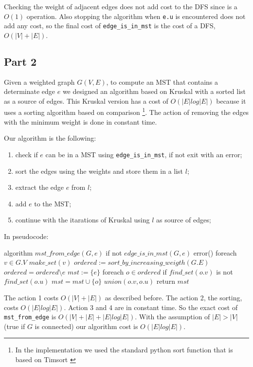 \documentclass[paper=a4, fontsize=11pt]{scrartcl} %
\numberwithin{equation}{section} %
\numberwithin{figure}{section} %
\numberwithin{table}{section} %
\begin{document}
Checking the weight of adjacent edges does not add cost to the DFS since is a $O(1)$ operation. Also stopping the algorithm when \verb|e.u| is encountered does not add any cost, so the final cost of \verb|edge_is_in_mst| is the cost of a DFS, $O(|V|+|E|)$.

\subsection*{Part 2}

Given a weighted graph $G(V, E)$, to compute an MST that contains a determinate edge $e$ we designed an algorithm based on Kruskal with a sorted list as a source of edges.
This Kruskal version has a cost of $O(|E|log|E|)$ because it uses a sorting algorithm based on comparison \footnote{In the implementation we used the standard python sort function that is based on Timsort \cite{timsort}}. The action of removing the edges with the minimum weight is done in constant time.

Our algorithm is the following:

\begin{enumerate}
    \item check if $e$ can be in a MST using \verb|edge_is_in_mst|, if not exit with an error;
    \item sort the edges using the weights and store them in a list $l$;
    \item extract the edge $e$ from $l$;
    \item add $e$ to the MST;
    \item continue with the itarations of Kruskal using $l$ as source of edges;
\end{enumerate}

In pseudocode:

\begin{pseudo}
algorithm $mst\_from\_edge(G, e)$
    if not $edge\_is\_in\_mst(G, e)$
        error()
    foreach $v \in G.V$
        $make\_set(v)$
    $ordered := sort\_by\_increasing\_weigth(G.E)$
    $ordered = ordered \setminus e$
    $mst := \{e\}$
    foreach $o \in ordered$
        if $find\_set(o.v)$ is not $find\_set(o.u)$
            $mst = mst \cup \{o\}$
            $union(o.v, o.u)$
    return $mst$
\end{pseudo}

The action 1 costs $O(|V|+|E|)$ as described before.
The action 2, the sorting, costs $O(|E|log|E|)$.
Action 3 and 4 are in constant time.
So the exact cost of \verb|mst_from_edge| is $O(|V|+|E| + |E|log|E|)$.
With the assumption of $|E| > |V|$ (true if $G$ is connected)  our algorithm cost is $O(|E|log|E|)$.
\end{document}
